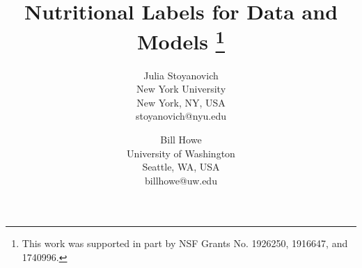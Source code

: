 \documentclass[11pt]{article}
\begin{document}

\title{Nutritional Labels for Data and Models
\footnote{This work was supported in part by NSF Grants No. 1926250, 1916647, and 1740996.}
}

\author{ Julia Stoyanovich
 \\
New York University \\
New York, NY, USA \\
stoyanovich@nyu.edu
\and
Bill Howe \\
University of Washington \\
Seattle, WA, USA \\
billhowe@uw.edu}

\maketitle


 
 

 
 

% 
% 

\begin{thebibliography}{10}
\itemsep=1pt
\begin{small}
		

\end{small}
\end{thebibliography} 
\end{document}
